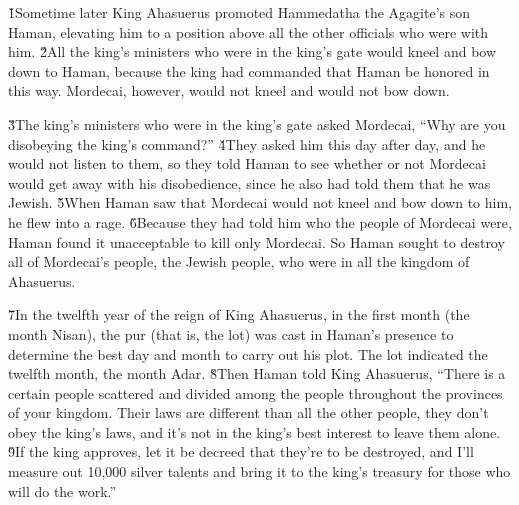 \v{1}Sometime later King Ahasuerus promoted Hammedatha the Agagite's son Haman, elevating him to a position above all the other officials who were with him. \v{2}All the king's ministers who were in the king's gate would kneel and bow down to Haman, because the king had commanded that Haman be honored in this way. Mordecai, however, would not kneel and would not bow down.

\v{3}The king's ministers who were in the king's gate asked Mordecai, ``Why are you disobeying the king's command?'' \v{4}They asked him this day after day, and he would not listen to them, so they told Haman to see whether or not Mordecai would get away with his disobedience, since he also had told them that he was Jewish. \v{5}When Haman saw that Mordecai would not kneel and bow down to him, he flew into a rage. \v{6}Because they had told him who the people of Mordecai were, Haman found it unacceptable to kill only Mordecai. So Haman sought to destroy all of Mordecai's people, the Jewish people, who were in all the kingdom of Ahasuerus.

\v{7}In the twelfth year of the reign of King Ahasuerus, in the first month (the month Nisan), the pur (that is, the lot) was cast in Haman's presence to determine the best day and month to carry out his plot. The lot indicated the twelfth month, the month Adar. \v{8}Then Haman told King Ahasuerus, ``There is a certain people scattered and divided among the people throughout the provinces of your kingdom. Their laws are different than all the other people, they don't obey the king's laws, and it's not in the king's best interest to leave them alone. \v{9}If the king approves, let it be decreed that they're to be destroyed, and I'll measure out 10,000 silver talents and bring it to the king's treasury for those who will do the work.''

